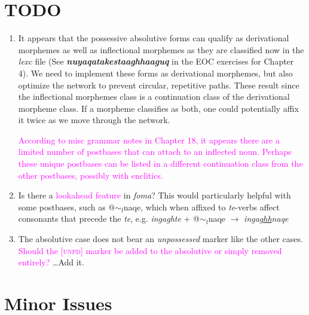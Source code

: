 \documentclass{article}
\begin{document}
\section{TODO}

\begin{enumerate}
\item It appears that the possessive absolutive forms can qualify as derivational morphemes as well as inflectional morphemes as they are classified now in the \textit{lexc} file (See \textit{\textbf{nuyaqatakestaaghhaaguq}} in the EOC exercises for Chapter 4).
%
We need to implement these forms as derivational morphemes, but also optimize the network to prevent circular, repetitive paths.
%
These result since the inflectional morphemes class is a continuation class of the derivational morpheme class.
%
If a morpheme classifies as both, one could potentially affix it twice as we move through the network.

\textcolor{magenta}{According to misc grammar notes in Chapter 18, it appears there are a limited number of postbases that can attach to an inflected noun.
%
Perhaps these unique postbases can be listed in a different continuation class from the other postbases, possibly with enclitics.}

\item Is there a \textcolor{magenta}{lookahead feature} in \textit{foma}? This would particularly helpful with some postbases, such as @${\sim}_\text{f}$naqe, which when affixed to \textit{te}-verbs affect consonants that precede the \textit{te}, e.g. \textit{ingaghte} + @${\sim}_\text{f}$naqe $\rightarrow$ \textit{inga\uline{ghh}naqe}

\item The absolutive case does not bear an \textit{unpossessed} marker like the other cases. \textcolor{magenta}{Should the [\textsc{unpd}] marker be added to the absolutive or simply removed entirely?} \ldots Add it.

\end{enumerate}


\section{Minor Issues}
\end{document}
